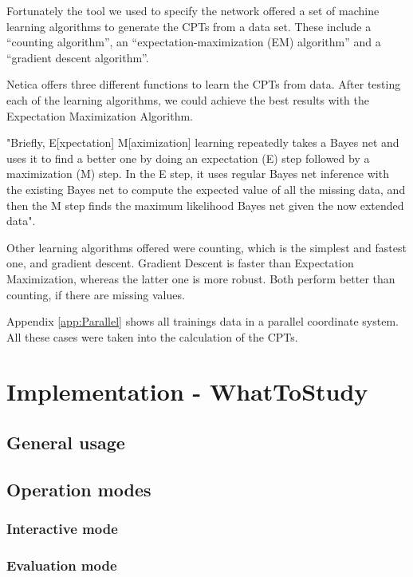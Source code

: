 \documentclass[%
	pdftex,
	oneside,        %
	11pt,           %
	parskip=half,   %
	headsepline,    %
	footsepline,    %
	abstracton,     %
	USenglish,      %
	a4paper,        %
]{report}
\begin{document}
Fortunately the tool we used to specify the network offered a set of machine learning algorithms to generate the CPTs from a data set. These include a \enquote{counting algorithm}, an \enquote{expectation-maximization (EM) algorithm} and a \enquote{gradient descent algorithm}.


Netica offers three different functions to learn the CPTs from data. After testing each of the learning algorithms, we could achieve the best results with the Expectation Maximization Algorithm.

"Briefly, E[xpectation] M[aximization] learning repeatedly takes a Bayes net and uses it to find a better one by doing an expectation (E) step followed by a maximization (M) step. In the E step, it uses regular Bayes net inference with the existing Bayes net to compute the expected value of all the missing data, and then the M step finds the maximum likelihood Bayes net given the now extended data". \cite[p. 48]{Corp.:2010aa}

Other learning algorithms offered were counting, which is the simplest and fastest one, and gradient descent. Gradient Descent is faster than Expectation Maximization, whereas the latter one is more robust. Both perform better than counting, if there are missing values.

Appendix \vref{app:Parallel} shows all trainings data in a parallel coordinate system. All these cases were taken into the calculation of the CPTs.

\chapter{Implementation - WhatToStudy}
\label{chapter:WhatToStudy}
\section{General usage}

\section{Operation modes}
\subsection{Interactive mode}
\subsection{Evaluation mode}
\end{document}
